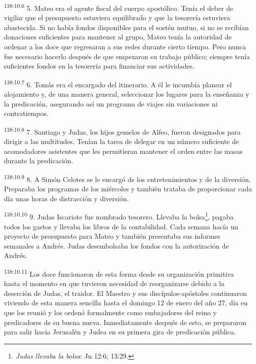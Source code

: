 \par
\textsuperscript{138:10.6} 5. Mateo era el agente fiscal del cuerpo apostólico. Tenía el deber de vigilar que el presupuesto estuviera equilibrado y que la tesorería estuviera abastecida. Si no había fondos disponibles para el sostén mutuo, si no se recibían donaciones suficientes para mantener al grupo, Mateo tenía la autoridad de ordenar a los doce que regresaran a sus redes durante cierto tiempo. Pero nunca fue necesario hacerlo después de que empezaron su trabajo público; siempre tenía suficientes fondos en la tesorería para financiar sus actividades.

\par
\textsuperscript{138:10.7} 6. Tomás era el encargado del itinerario. A él le incumbía planear el alojamiento y, de una manera general, seleccionar los lugares para la enseñanza y la predicación, asegurando así un programa de viajes sin variaciones ni contratiempos.

\par
\textsuperscript{138:10.8} 7. Santiago y Judas, los hijos gemelos de Alfeo, fueron designados para dirigir a las multitudes. Tenían la tarea de delegar en un número suficiente de acomodadores asistentes que les permitieran mantener el orden entre las masas durante la predicación.

\par
\textsuperscript{138:10.9} 8. A Simón Celotes se le encargó de los entretenimientos y de la diversión. Preparaba los programas de los miércoles y también trataba de proporcionar cada día unas horas de distracción y diversión.

\par
\textsuperscript{138:10.10} 9. Judas Iscariote fue nombrado tesorero. Llevaba la bolsa\footnote{\textit{Judas llevaba la bolsa}: Jn 12:6; 13:29.}, pagaba todos los gastos y llevaba los libros de la contabilidad. Cada semana hacía un proyecto de presupuesto para Mateo y también presentaba sus informes semanales a Andrés. Judas desembolsaba los fondos con la autorización de Andrés.

\par
\textsuperscript{138:10.11} Los doce funcionaron de esta forma desde su organización primitiva hasta el momento en que tuvieron necesidad de reorganizarse debido a la deserción de Judas, el traidor. El Maestro y sus discípulos-apóstoles continuaron viviendo de esta manera sencilla hasta el domingo 12 de enero del año 27, día en que los reunió y los ordenó formalmente como embajadores del reino y predicadores de su buena nueva. Inmediatamente después de esto, se prepararon para salir hacia Jerusalén y Judea en su primera gira de predicación pública.
